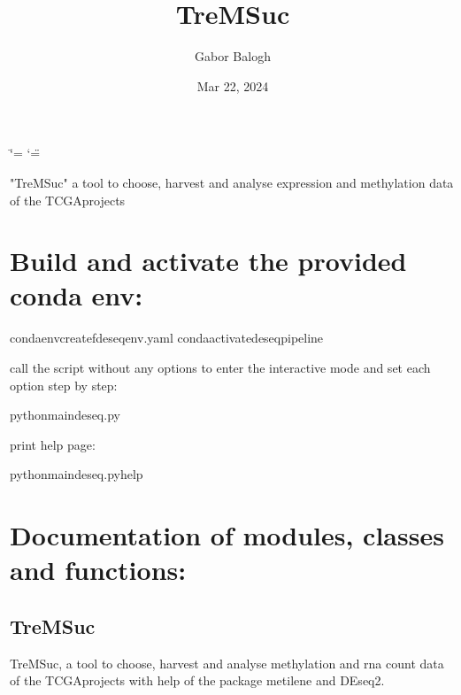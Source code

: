 \documentclass[letterpaper,10pt,english]{sphinxmanual}
\title{TreMSuc}
\date{Mar 22, 2024}
\author{Gabor Balogh}
\begin{document}
\ifdefined\shorthandoff
  \ifnum\catcode`\=\string=\active\shorthandoff{=}\fi
  \ifnum\catcode`\"=\active{}\fi
\fi

\pagestyle{empty}
\sphinxmaketitle
\pagestyle{plain}
\sphinxtableofcontents
\pagestyle{normal}
\label{\detokenize{index::doc}}


\sphinxAtStartPar
"TreMSuc" a tool to choose, harvest and analyse expression and methylation data
of the TCGA\sphinxhyphen{}projects


\chapter{Build and activate the provided conda env:}
\label{\detokenize{index:build-and-activate-the-provided-conda-env}}
\begin{sphinxVerbatim}[commandchars=\\\{\}]
\PYGZdl{}condaenvcreate\PYGZhy{}fdeseq\PYGZus{}env.yaml
\PYGZdl{}condaactivatedeseq\PYGZus{}pipeline
\end{sphinxVerbatim}

\sphinxAtStartPar
call the script without any options to enter the interactive mode and set
each option step by step:

\begin{sphinxVerbatim}[commandchars=\\\{\}]
\PYGZdl{}pythonmain\PYGZus{}deseq.py
\end{sphinxVerbatim}

\sphinxAtStartPar
print help page:

\begin{sphinxVerbatim}[commandchars=\\\{\}]
\PYGZdl{}pythonmain\PYGZus{}deseq.py\PYGZhy{}\PYGZhy{}help
\end{sphinxVerbatim}


\chapter{Documentation of modules, classes and functions:}
\label{\detokenize{index:documentation-of-modules-classes-and-functions}}

\section{TreMSuc}
\label{\detokenize{index:tremsuc}}
\sphinxAtStartPar
TreMSuc, a tool to choose, harvest and analyse methylation and rna
count data of the TCGA\sphinxhyphen{}projects with help of the package metilene and
DEseq2.
\end{document}
